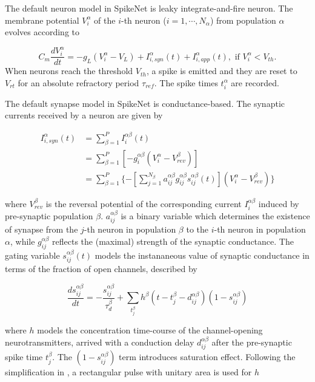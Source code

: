 \documentclass{article}
\begin{document}

The default neuron model in SpikeNet is leaky integrate-and-fire neuron. 
The membrane potential $V^{\alpha}_{i}$ of the $i$-th neuron ($i=1,\cdots,N_{\alpha}$) from population $\alpha$ evolves according to

\begin{equation}
C_{m}\frac{dV^{\alpha}_{i}}{dt} = -g_{L}(V^{\alpha}_{i}-V_{L}) + I^{\alpha}_{i,syn}(t) + I^{\alpha}_{i,app}(t), \text{ if } V^{\alpha}_{i} < V_{th}.
\end{equation}
When neurons reach the threshold $V_{th}$, a spike is emitted and they are reset to $V_{rt}$ for an absolute refractory period $\tau_{ref}$. 
The spike times $t^{\alpha}_{i}$ are recorded.

The default synapse model in SpikeNet is conductance-based. 
The synaptic currents received by a neuron are given by

\begin{align}
I^{\alpha}_{i,syn}(t) &= \sum_{\beta=1}^{P}I^{\alpha\beta}_{i}(t) \\
 &= \sum_{\beta=1}^{P}[-g_{i}^{\alpha\beta}(V^{\alpha}_{i}-V_{rev}^{\beta})] \\
 &= \sum_{\beta=1}^{P}\{-[\sum_{j=1}^{N_{\beta}}a_{ij}^{\alpha\beta}g_{ij}^{\alpha\beta}s_{ij}^{\alpha\beta}(t)](V^{\alpha}_{i}-V_{rev}^{\beta})\}\label{eq:I_syn}
\end{align}


\noindent
where $V_{rev}^{\beta}$ is the reversal potential of the corresponding current $I^{\alpha\beta}_{i}$ induced by pre-synaptic population $\beta$. 
$a_{ij}^{\alpha\beta}$ is a binary variable which determines the existence of synapse from the $j$-th neuron in population $\beta$ to the $i$-th neuron in  population $\alpha$, while $g_{ij}^{\alpha\beta}$ reflects the (maximal) strength of the synaptic conductance. 
The gating variable $s_{ij}^{\alpha\beta}(t)$ models the instananeous value of synaptic conductance in terms of the fraction of open channels, described by

\begin{equation}
\frac{ds_{ij}^{\alpha\beta}}{dt} = -\frac{s_{ij}^{\alpha\beta}}{\tau_{d}^{\beta}}+\sum_{t^{\beta}_{j}}h^{\beta}(t-t^{\beta}_{j}-d^{\alpha\beta}_{ij})(1-s_{ij}^{\alpha\beta})
\label{eq:gating}
\end{equation}

\noindent
where $h$ models the concentration time-course of the channel-opening neurotransmitters, arrived with a conduction delay $d^{\alpha\beta}_{ij}$ after the pre-synaptic spike time $t^{\beta}_{j}$. 
The $(1-s_{ij}^{\alpha\beta})$ term introduces saturation effect. 
Following the simplification in \cite{destexhe1994efficient}, a rectangular pulse with unitary area is used for $h$
\end{document}
